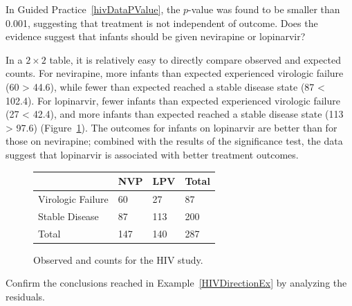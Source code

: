 
\begin{examplewrap}
\begin{nexample}{In Guided Practice~\ref{hivDataPValue}, the $p$-value was found to be smaller than 0.001, suggesting that treatment is not independent of outcome. Does the evidence suggest that infants should be given nevirapine or lopinarvir?}\label{HIVDirectionEx}%

In a $2 \times 2$ table, it is relatively easy to directly compare observed and expected counts.
For nevirapine, more infants than expected experienced virologic failure (60 > 44.6), while fewer than expected reached a stable disease state (87 < 102.4). For lopinarvir, fewer infants than expected experienced virologic failure (27 < 42.4), and more infants than expected reached a stable disease state (113 > 97.6) (Figure~\ref{observedAndExpectedCountsForTheHivStudy}). The outcomes for infants on lopinarvir are better than for those on nevirapine; combined with the results of the significance test, the data suggest that lopinarvir is associated with better treatment outcomes.
\end{nexample}
\end{examplewrap}

\begin{figure}[h]
	\centering
	\begin{tabular}{l | l l | l}
		\hline
		& NVP & LPV & Total \\
		\hline
		Virologic Failure & 60 \highlightO{44.6} & 27 \highlightO{42.4} & 87 \\
		Stable Disease & 87 \highlightO{102.4} & 113 \highlightO{97.6}& 200 \\
		\hline
		Total & 147 & 140 & 287 \\
		\hline
	\end{tabular}
	\caption{Observed and  counts for the HIV study.}
	\label{observedAndExpectedCountsForTheHivStudy}
\end{figure}

\begin{exercisewrap}
\begin{nexercise}
Confirm the conclusions reached in Example~\ref{HIVDirectionEx} by analyzing the residuals.\footnotemark{}
\end{nexercise}
\end{exercisewrap}

